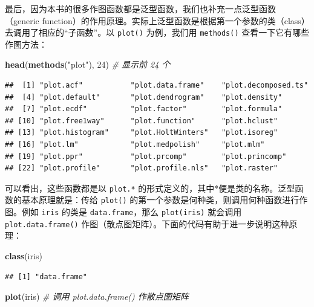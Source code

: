 \documentclass[
  b5paper,
  UTF8,twoside]{book}
\newenvironment{Shaded}{\begin{snugshade}}{\end{snugshade}}
\newcommand{\CommentTok}[1]{\textcolor[rgb]{0.56,0.35,0.01}{\textit{#1}}}
\newcommand{\DecValTok}[1]{\textcolor[rgb]{0.00,0.00,0.81}{#1}}
\newcommand{\FunctionTok}[1]{\textcolor[rgb]{0.13,0.29,0.53}{\textbf{#1}}}
\newcommand{\NormalTok}[1]{#1}
\newcommand{\StringTok}[1]{\textcolor[rgb]{0.31,0.60,0.02}{#1}}
\begin{document}
最后，因为本书的很多作图函数都是泛型函数，我们也补充一点泛型函数 （generic function）的作用原理。实际上泛型函数是根据第一个参数的类（class）去调用了相应的``子函数''。以 \texttt{plot()} 为例，我们用 \texttt{methods()} 查看一下它有哪些作图方法：

\begin{Shaded}
\begin{Highlighting}[]
\FunctionTok{head}\NormalTok{(}\FunctionTok{methods}\NormalTok{(}\StringTok{"plot"}\NormalTok{), }\DecValTok{24}\NormalTok{) }\CommentTok{\# 显示前 24 个}
\end{Highlighting}
\end{Shaded}

\begin{verbatim}
##  [1] "plot.acf"           "plot.data.frame"    "plot.decomposed.ts"
##  [4] "plot.default"       "plot.dendrogram"    "plot.density"      
##  [7] "plot.ecdf"          "plot.factor"        "plot.formula"      
## [10] "plot.free1way"      "plot.function"      "plot.hclust"       
## [13] "plot.histogram"     "plot.HoltWinters"   "plot.isoreg"       
## [16] "plot.lm"            "plot.medpolish"     "plot.mlm"          
## [19] "plot.ppr"           "plot.prcomp"        "plot.princomp"     
## [22] "plot.profile"       "plot.profile.nls"   "plot.raster"
\end{verbatim}

可以看出，这些函数都是以 \texttt{plot.*} 的形式定义的，其中*便是类的名称。泛型函数的基本原理就是：传给 \texttt{plot()} 的第一个参数是何种类，则调用何种函数进行作图。例如 \texttt{iris} 的类是 \texttt{data.frame}，那么 \texttt{plot(iris)} 就会调用 \texttt{plot.data.frame()} 作图（散点图矩阵）。下面的代码有助于进一步说明这种原理：

\begin{Shaded}
\begin{Highlighting}[]
\FunctionTok{class}\NormalTok{(iris)}
\end{Highlighting}
\end{Shaded}

\begin{verbatim}
## [1] "data.frame"
\end{verbatim}

\begin{Shaded}
\begin{Highlighting}[]
\FunctionTok{plot}\NormalTok{(iris) }\CommentTok{\# 调用 plot.data.frame() 作散点图矩阵}
\end{Highlighting}
\end{Shaded}
\end{document}
